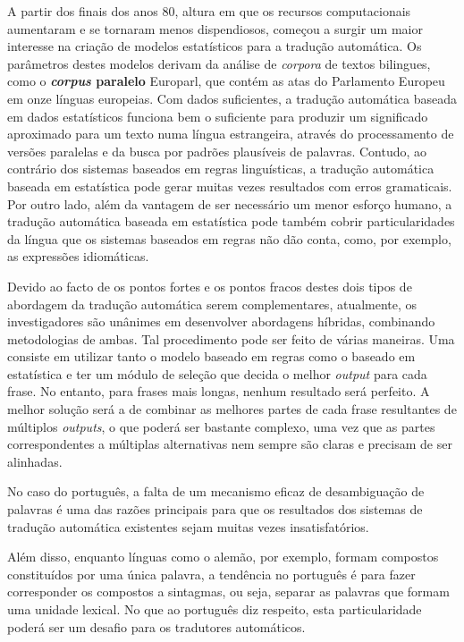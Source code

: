 \documentclass[]{../metanetpaper}
\begin{document}
\begin{multicols}{2}
A partir dos finais dos anos 80, altura em que os recursos computacionais aumentaram e se tornaram menos dispendiosos, começou a surgir um maior interesse na criação de modelos estatísticos para a tradução automática. Os parâmetros destes modelos derivam da análise de \textit{corpora} de textos bilingues, como o \textbf{\textit{corpus} paralelo} Europarl, que contém as atas do Parlamento Europeu em onze línguas europeias. Com dados suficientes, a tradução automática baseada em dados estatísticos funciona bem o suficiente para produzir um significado aproximado para um texto numa língua estrangeira, através do processamento de versões paralelas e da busca por padrões plausíveis de palavras. Contudo, ao contrário dos sistemas baseados em regras linguísticas, a tradução automática baseada em estatística pode gerar muitas vezes resultados com erros gramaticais. Por outro lado, além da vantagem de ser necessário um menor esforço humano, a tradução automática baseada em estatística pode também cobrir particularidades da língua que os sistemas baseados em regras não dão conta, como, por exemplo, as expressões idiomáticas.

Devido ao facto de os pontos fortes e os pontos fracos destes dois tipos de abordagem da tradução automática serem complementares, atualmente, os investigadores são unânimes em desenvolver abordagens híbridas, combinando metodologias de ambas. Tal procedimento pode ser feito de várias maneiras. Uma consiste em utilizar tanto o modelo baseado em regras como o baseado em estatística e ter um módulo de seleção que decida o melhor \textit{output} para cada frase. No entanto, para frases mais longas, nenhum resultado será perfeito. A melhor solução será a de combinar as melhores partes de cada frase resultantes de múltiplos \textit{outputs}, o que poderá ser bastante complexo, uma vez que as partes cor\-res\-pon\-den\-tes a múltiplas alternativas nem sempre são claras e precisam de ser alinhadas.

No caso do português, a falta de um mecanismo eficaz de desambiguação de palavras é uma das razões principais para que os resultados dos sistemas de tradução automática existentes sejam muitas vezes insatisfatórios.

Além disso, enquanto línguas como o alemão, por exemplo, formam compostos constituídos por uma única palavra, a tendência no português é para fazer corresponder os compostos a sintagmas, ou seja, separar as palavras que formam uma unidade lexical. No que ao português diz respeito, esta particularidade poderá ser um desafio para os tradutores automáticos.


\end{multicols}
\end{document}
